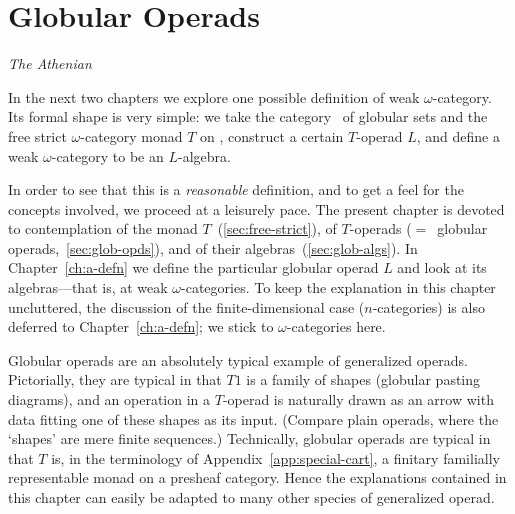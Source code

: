 
\chapter{Globular Operads}


{\emph{The Athenian}~\cite{Athenian}}


\noindent
In the next two chapters we explore one possible definition of weak
$\omega$-category.  Its formal shape is very simple: we take
the category \Eee\ of globular sets and the free strict $\omega$-category
monad $T$ on \Eee, construct a certain $T$-operad $L$, and define a weak
$\omega$-category to be an $L$-algebra. 

In order to see that this is a \emph{reasonable} definition, and to get a
feel for the concepts involved, we proceed at a leisurely pace.  The
present chapter is devoted to contemplation of the monad
$T$~(\ref{sec:free-strict}), of $T$-operads ($=$~globular
operads,~\ref{sec:glob-opds}), and of their algebras~(\ref{sec:glob-algs}).
In Chapter~\ref{ch:a-defn} we define the particular globular operad $L$ and
look at its algebras---that is, at weak $\omega$-categories.  To keep the
explanation in this chapter uncluttered, the discussion of the
finite-dimensional case ($n$-categories) is also deferred to
Chapter~\ref{ch:a-defn}; we stick to $\omega$-categories here.

Globular operads are an absolutely typical example of generalized operads.
Pictorially, they are typical in that $T1$ is a family of shapes (globular
pasting diagrams), and an operation in a $T$-operad is naturally drawn as
an arrow with data fitting one of these shapes as its input.  (Compare
plain operads, where the `shapes' are mere finite sequences.)  Technically,
globular operads are typical in that $T$ is, in the terminology of
Appendix~\ref{app:special-cart}, a finitary familially representable monad
on a presheaf category.  Hence the explanations contained in this chapter
can easily be adapted to many other species of generalized operad.





